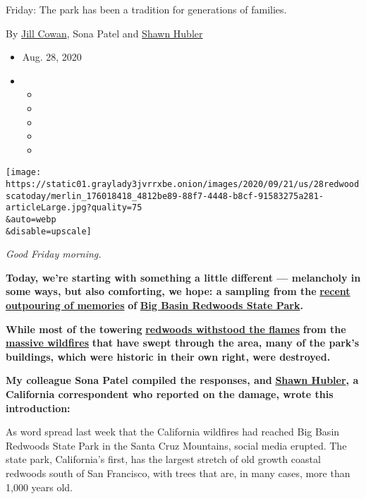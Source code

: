 Friday: The park has been a tradition for generations of families.

By \href{https://www.nytimes3xbfgragh.onion/by/jill-cowan}{Jill Cowan},
Sona Patel and
\href{https://www.nytimes3xbfgragh.onion/by/shawn-hubler}{Shawn Hubler}

\begin{itemize}
\item
  Aug. 28, 2020
\item
  \begin{itemize}
  \item
  \item
  \item
  \item
  \item
  \end{itemize}
\end{itemize}

\texttt{[image: https://static01.graylady3jvrrxbe.onion/images/2020/09/21/us/28redwoodscatoday/merlin\_176018418\_4812be89-88f7-4448-b8cf-91583275a281-articleLarge.jpg?quality=75\\\&auto=webp\\\&disable=upscale]}

\emph{Good Friday morning.}

\textbf{Today, we're starting with something a little different ---
melancholy in some ways, but also comforting, we hope: a sampling from
the}
\textbf{\href{https://www.nytimes3xbfgragh.onion/2020/08/25/reader-center/share-memories-of-big-basin.html?}{recent
outpouring of memories}} \textbf{of}
\textbf{\href{https://www.nytimes3xbfgragh.onion/2020/08/21/us/big-basin-redwoods-ca-fires.html}{Big
Basin Redwoods State Park}.}

\textbf{While most of the towering}
\textbf{\href{https://apnews.com/efa48694b12c74a9700b03dbe3ffde30}{redwoods
withstood the flames}} \textbf{from the}
\textbf{\href{https://www.nytimes3xbfgragh.onion/2020/08/25/us/california-fires-why-this-year-is-different.html}{massive
wildfires}} \textbf{that have swept through the area, many of the park's
buildings, which were historic in their own right, were destroyed.}

\textbf{My colleague Sona Patel compiled the responses, and}
\textbf{\href{https://www.nytimes3xbfgragh.onion/by/shawn-hubler}{Shawn
Hubler}, a California correspondent who reported on the damage, wrote
this introduction:}

As word spread last week that the California wildfires had reached Big
Basin Redwoods State Park in the Santa Cruz Mountains, social media
erupted. The state park, California's first, has the largest stretch of
old growth coastal redwoods south of San Francisco, with trees that are,
in many cases, more than 1,000 years old.

